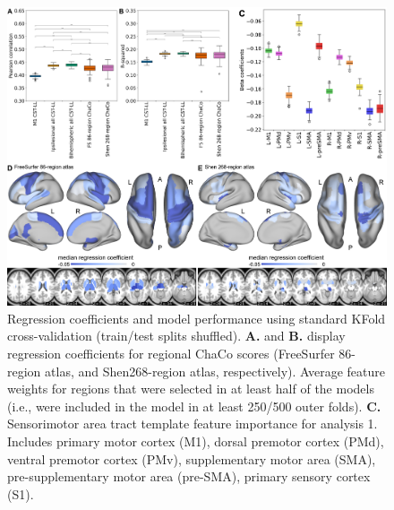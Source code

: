 \documentclass[10pt]{article}
\begin{document}
\begin{figure}[htp]
\centering
\includegraphics[width=1\linewidth]{figures/Analysis1.png}
\caption{Regression coefficients and model performance using standard KFold cross-validation (train/test splits shuffled). \textbf{A.} and \textbf{B.} display regression coefficients for regional ChaCo scores (FreeSurfer 86-region atlas, and Shen268-region atlas, respectively). Average feature weights for regions that were selected in at least half of the models (i.e., were included in the model in at least 250/500 outer folds). \textbf{C.} Sensorimotor area tract template feature importance for analysis 1. Includes primary motor cortex (M1), dorsal premotor cortex (PMd), ventral premotor cortex (PMv), supplementary motor area (SMA), pre-supplementary motor area (pre-SMA), primary sensory cortex (S1).}
\label{nemotool}
\end{figure}
\end{document}
